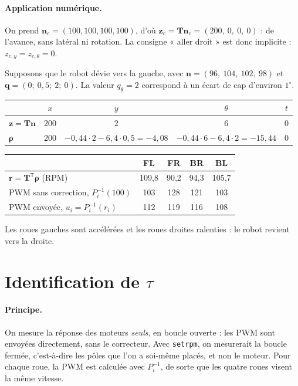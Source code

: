\documentclass[11pt,a4paper]{article}
\newcommand{\vect}[1]{\boldsymbol{#1}}
\newcommand{\T}{\mathsf{T}}
\newcommand{\Tm}{\vect{T}}
\begin{document}
\paragraph{Application numérique.}
On prend $\vect n_c=(100,100,100,100)$, d'où
$\vect z_c=\Tm\vect n_c=(200,\ 0,\ 0,\ 0)$ : de l'avance, sans latéral ni rotation.
La consigne « aller droit » est donc implicite : $z_{c,y}=z_{c,\theta}=0$.

Supposons que le robot dévie vers la gauche, avec $\vect n=(96,\ 104,\ 102,\ 98)$ et $\vect q=(0;\ 0{,}5;\ 2;\ 0)$.
La valeur $q_\theta=2$ correspond à un écart de cap d'environ $1^\circ$.
\begin{center}
\begin{tabular}{lcccc}
\toprule
 & $x$ & $y$ & $\theta$ & $t$\\
\midrule
$\vect z=\Tm\vect n$ & 200 & 2 & 6 & 0\\
$\vect\rho$ & $200$ & $-0{,}44\cdot2-6{,}4\cdot0{,}5=-4{,}08$ & $-0{,}44\cdot6-6{,}4\cdot2=-15{,}44$ & 0\\
\bottomrule
\end{tabular}
\end{center}
\begin{center}
\begin{tabular}{lcccc}
\toprule
 & FL & FR & BR & BL\\
\midrule
$\vect r=\Tm^\T\vect\rho$ (RPM) & 109,8 & 90,2 & 94,3 & 105,7\\
PWM sans correction, $P_i^{-1}(100)$ & 103 & 128 & 121 & 103\\
PWM envoyée, $u_i=P_i^{-1}(r_i)$ & 112 & 119 & 116 & 108\\
\bottomrule
\end{tabular}
\end{center}
Les roues gauches sont accélérées et les roues droites ralenties : le robot revient vers la droite.

\section{Identification de $\tau$}\label{sec:ident}

\paragraph{Principe.}
On mesure la réponse des moteurs \emph{seuls}, en boucle ouverte : les PWM sont envoyées directement, sans le correcteur.
Avec \texttt{setrpm}, on mesurerait la boucle fermée, c'est-à-dire les pôles que l'on a soi-même placés, et non le moteur.
Pour chaque roue, la PWM est calculée avec $P_i^{-1}$, de sorte que les quatre roues visent la même vitesse.
\end{document}
